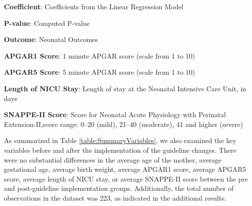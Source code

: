 \documentclass[11pt]{article}
\begin{document}
\begin{table}[h]
\caption{Linear regression analysis of impact of policy change on neonatal outcomes}
\label{table:PolicyImpactOutcomes}
\begin{threeparttable}
\renewcommand{\TPTminimum}{\linewidth}
\begin{tablenotes}
\footnotesize
\item \textbf{Coefficient}: Coefficients from the Linear Regression Model
\item \textbf{P-value}: Computed P-value
\item \textbf{Outcome}: Neonatal Outcomes
\item \textbf{APGAR1 Score}: 1 minute APGAR score (scale from 1 to 10)
\item \textbf{APGAR5 Score}: 5 minute APGAR score (scale from 1 to 10)
\item \textbf{Length of NICU Stay}: Length of stay at the Neonatal Intensive Care Unit, in days
\item \textbf{SNAPPE-II Score}: Score for Neonatal Acute Physiology with Perinatal Extension-II,score range: 0–20 (mild), 21–40 (moderate), 41 and higher (severe)
\end{tablenotes}
\end{threeparttable}
\end{table}


As summarized in Table {}\ref{table:SummaryVariables}, we also examined the key variables before and after the implementation of the guideline changes. There were no substantial differences in the average age of the mother, average gestational age, average birth weight, average APGAR1 score, average APGAR5 score, average length of NICU stay, or average SNAPPE-II score between the pre and post-guideline implementation groups. Additionally, the total number of observations in the dataset was 223, as indicated in the additional results.
\end{document}
